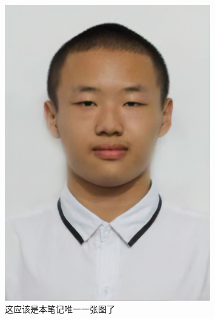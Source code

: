 \begin{figure}
    \centering
    \includegraphics[width=0.8\textwidth,clip]{mypic.jpg}
    \caption{这应该是本笔记唯一一张图了}
\end{figure}
